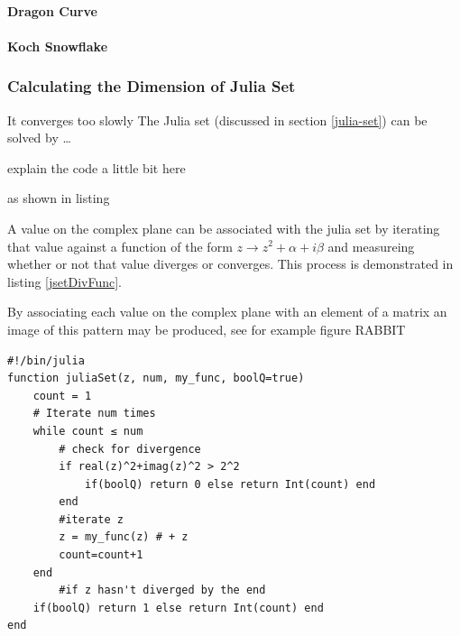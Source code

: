 \documentclass[11pt]{article}
\begin{document}
\paragraph{Dragon Curve}
\label{sec:org4a11d53}
\paragraph{Koch Snowflake}
\label{sec:org46aa0a7}
\subsubsection{Calculating the Dimension of Julia Set}
\label{sec:orgb6b1180}
It converges too slowly
The Julia set (discussed in section \ref{julia-set}) can be solved by \ldots{}

explain the code a little bit here

as shown in listing

A value on the complex plane can be associated with the julia set by iterating
that value against a function of the form \(z \rightarrow z^{2} + \alpha + i
\beta\) and measureing whether or not that value diverges or converges. This process is demonstrated in listing \ref{jsetDivFunc}.

By associating each value on the complex plane with an element of a matrix an image of this pattern may be produced, see for example figure RABBIT

\begin{lstlisting}
#!/bin/julia
function juliaSet(z, num, my_func, boolQ=true)
    count = 1
    # Iterate num times
    while count ≤ num
        # check for divergence
        if real(z)^2+imag(z)^2 > 2^2
            if(boolQ) return 0 else return Int(count) end
        end
        #iterate z
        z = my_func(z) # + z
        count=count+1
    end
        #if z hasn't diverged by the end
    if(boolQ) return 1 else return Int(count) end
end
\end{lstlisting}
\end{document}
